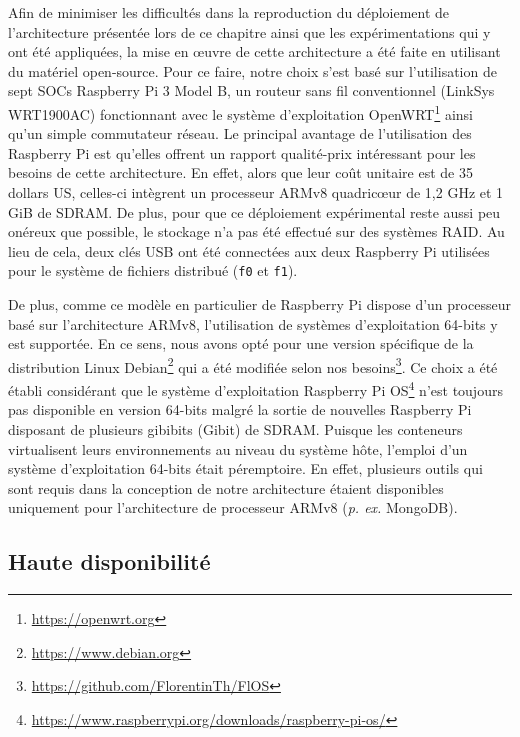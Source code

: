 Afin de minimiser les difficultés dans la reproduction du déploiement de l'architecture présentée lors de ce chapitre ainsi que les expérimentations qui y ont été appliquées, la mise en \oe{}uvre de cette architecture a été faite en utilisant du matériel open-source. Pour ce faire, notre choix s'est basé sur l'utilisation de sept \acsp{SOC} Raspberry Pi 3 Model B, un routeur sans fil conventionnel (LinkSys WRT1900AC) fonctionnant avec le système d'exploitation OpenWRT\footnote{\url{https://openwrt.org}} ainsi qu'un simple commutateur réseau. Le principal avantage de l'utilisation des Raspberry Pi est qu'elles offrent un rapport qualité-prix intéressant pour les besoins de cette architecture. En effet, alors que leur coût unitaire est de 35 dollars US, celles-ci intègrent un processeur ARMv8 quadric\oe{}ur de 1,2 GHz et 1 GiB de SDRAM. De plus, pour que ce déploiement expérimental reste aussi peu onéreux que possible, le stockage n'a pas été effectué sur des systèmes RAID. Au lieu de cela, deux clés USB ont été connectées aux deux Raspberry Pi utilisées pour le système de fichiers distribué (\texttt{f0} et \texttt{f1}).

De plus, comme ce modèle en particulier de Raspberry Pi dispose d'un processeur basé sur l'architecture ARMv8, l'utilisation de systèmes d'exploitation 64-bits y est supportée. En ce sens, nous avons opté pour une version spécifique de la distribution Linux Debian\footnote{\url{https://www.debian.org}} qui a été modifiée selon nos besoins\footnote{\url{https://github.com/FlorentinTh/FlOS}}. Ce choix a été établi considérant que le système d'exploitation Raspberry Pi OS\footnote{\url{https://www.raspberrypi.org/downloads/raspberry-pi-os/}} n'est toujours pas disponible en version 64-bits malgré la sortie de nouvelles Raspberry Pi disposant de plusieurs gibibits (Gibit) de SDRAM. Puisque les conteneurs virtualisent leurs environnements au niveau du système hôte, l'emploi d'un système d'exploitation 64-bits était péremptoire. En effet, plusieurs outils qui sont requis dans la conception de notre architecture étaient disponibles uniquement pour l'architecture de processeur ARMv8 (\textit{p. ex.} MongoDB).

\subsection{Haute disponibilité}

